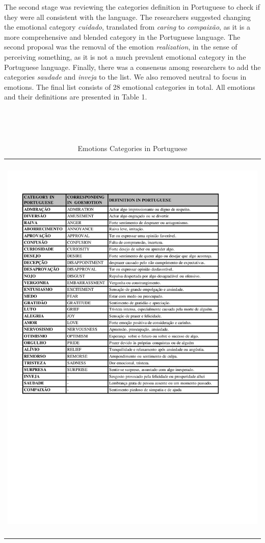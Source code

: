 \documentclass[12pt]{article}
\begin{document}
The second stage was reviewing the categories definition in Portuguese to check if they were all consistent with the language. The researchers suggested changing the emotional category \textit{cuidado}, translated from \textit{caring} to \textit{compaixão}, as it is a more comprehensive and blended category in the Portuguese language. The second proposal was the removal of the emotion \textit{realization}, in the sense of perceiving something, as it is not a much prevalent emotional category in the Portuguese language. Finally, there was a consensus among researchers to add the categories \textit{saudade} and \textit{inveja} to the list. We also removed neutral to focus in emotions. The final list consists of 28 emotional categories in total. All emotions and their definitions are presented in Table 1.

\begin{table}
  \caption{Emotions Categories in Portuguese}
  \label{tab:emotions}
  \begin{tabularx}{\textwidth}{X}
    \includegraphics[trim=0cm 0cm 0cm 0cm, clip, width=\textwidth]{img-n-tables/EMOCOES}
  \end{tabularx}
\end{table}
\end{document}
